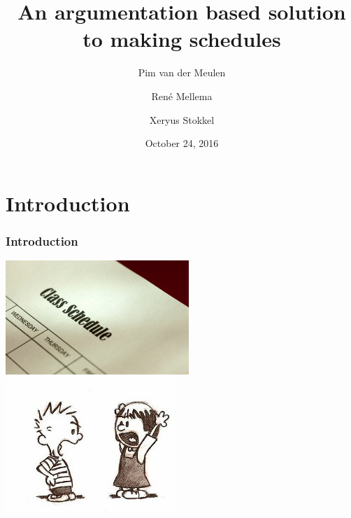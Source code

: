 \documentclass{beamer}
\title{An argumentation based solution to making schedules}
\author{Pim van der Meulen \and Ren\'e Mellema \and Xeryus Stokkel}
\date{October 24, 2016}
\begin{document}
\frame{\titlepage}

\section{Introduction}
\begin{frame}
	\frametitle{Introduction}
	\includegraphics[width=0.52\textwidth]{Schedule.jpg}%
	\includegraphics[width=0.48\textwidth]{Argument.jpg}
\end{frame}
\end{document}
